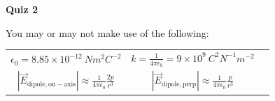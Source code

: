 \documentclass{article}
\begin{document}
\fancyfoot[C]{\thepage}
\vspace*{0cm}
\begin{center}
	{\LARGE \textbf{Quiz 2}}
\end{center}
You may or may not make use of the following:
\vspace{.5cm}

\renewcommand{\arraystretch}{2}
\begin{tabular}{ccc}
$\epsilon_0=8.85\times10^{-12}\ Nm^2C^{-2}$ & $k=\frac{1}{4\pi\epsilon_0}=9\times10^9\ C^2N^{-1}m^{-2}$\\
$|\vec{E}_\mathrm{dipole,on-axis}| \approx \frac{1}{4\pi\epsilon_0}\frac{2p}{r^3}$ & $|\vec{E}_\mathrm{dipole,perp}| \approx \frac{1}{4\pi\epsilon_0}\frac{p}{r^3}$
\end{tabular}
\end{document}
